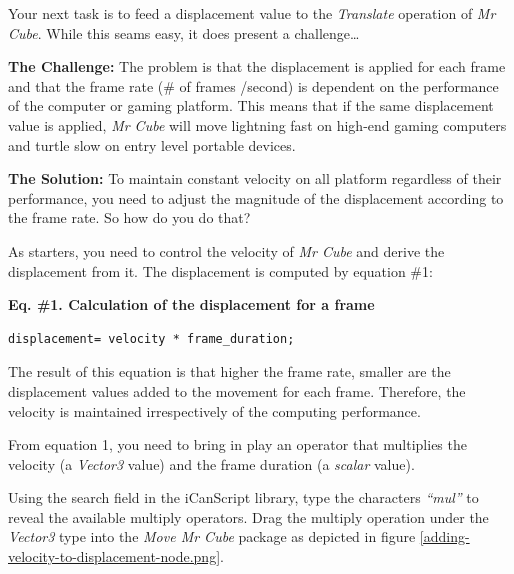 Your next task is to feed a displacement value to the \emph{Translate} operation of \emph{Mr Cube}. While this seams easy, it does present a challenge{\ldots}

\textbf{The Challenge:}
The problem is that the displacement is applied for each frame and that the frame rate (\# of frames \slash  second) is dependent on the performance of the computer or gaming platform. This means that if the same displacement value is applied, \emph{Mr Cube} will move lightning fast on high-end gaming computers and turtle slow on entry level portable devices.

\textbf{The Solution:}
To maintain constant velocity on all platform regardless of their performance, you need to adjust the magnitude of the displacement according to the frame rate. So how do you do that?

As starters, you need to control the velocity of \emph{Mr Cube} and derive the displacement from it. The displacement is computed by equation \#1:
\begin{tipbox}

\textbf{Eq. \#1. Calculation of the displacement for a frame}

\begin{verbatim}
displacement= velocity * frame_duration;
\end{verbatim}

\end{tipbox}



The result of this equation is that higher the frame rate, smaller are the displacement values added to the movement for each frame. Therefore, the velocity is maintained irrespectively of the computing performance.

From equation 1, you need to bring in play an operator that multiplies the velocity (a \emph{Vector3} value) and the frame duration (a \emph{scalar} value).

Using the search field in the iCanScript library, type the characters \emph{``mul''} to reveal the available multiply operators. Drag the multiply operation under the \emph{Vector3} type into the \emph{Move Mr Cube} package as depicted in figure \ref{adding-velocity-to-displacement-node.png}.

